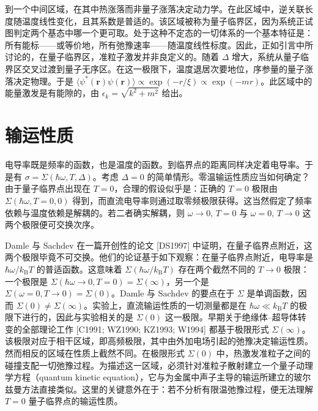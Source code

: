 到一个中间区域，在其中热涨落而非量子涨落决定动力学。在此区域中，逆关联长度随温度线性变化，且其系数是普适的。该区域被称为量子临界区，因为系统正试图判定两个基态中哪一个更可取。处于这种不定态的一切体系的一个基本特征是：所有能标——或等价地，所有弛豫速率——随温度线性标度。因此，正如引言中所讨论的，在量子临界区，准粒子激发并非良定义的。随着 $\Delta$ 增大，系统从量子临界区交叉过渡到量子无序区。在这一极限下，温度退居次要地位，序参量的量子涨落决定物理。于是 $\langle\psi^{*}(\mathbf{r})\psi(\mathbf{r})\rangle\propto\exp(-r/\xi)\propto\exp(-mr)$。此区域中的能量激发是有能隙的，由 $\epsilon_{k}=\sqrt{k^{2}+m^{2}}$ 给出。

\section{输运性质}

电导率既是频率的函数，也是温度的函数。到临界点的距离同样决定着电导率。于是有 $\sigma=\Sigma(\hbar\omega,T,\Delta)$。考虑 $\Delta=0$ 的简单情形。零温输运性质应当如何确定？由于量子临界点出现在 $T=0$，合理的假设似乎是：正确的 $T=0$ 极限由 $\Sigma(\hbar\omega,T=0,0)$ 得到，而直流电导率则通过取零频极限获得。这当然假定了频率依赖与温度依赖是解耦的。若二者确实解耦，则 $\omega\to0,\,T=0$ 与 $\omega=0,\,T\to0$ 这两个极限便可交换次序。

Damle 与 Sachdev 在一篇开创性的论文 [DS1997] 中证明，在量子临界点附近，这两个极限毕竟不可交换。他们的论证基于如下观察：在量子临界点附近，电导率是 $\hbar\omega/k_{\mathrm{B}}T$ 的普适函数。这意味着 $\Sigma(\hbar\omega/k_{\mathrm{B}}T)$ 存在两个截然不同的 $T\to0$ 极限：一个极限是 $\Sigma(\hbar\omega\to0,T=0)=\Sigma(\infty)$，另一个是 $\Sigma(\omega=0,T\to0)=\Sigma(0)$。Damle 与 Sachdev 的要点在于 $\Sigma$ 是单调函数，因而 $\Sigma(0)\neq\Sigma(\infty)$。实验上，直流输运性质的一切测量都是在 $\hbar\omega\ll k_{\mathrm{B}}T$ 的极限下进行的，因此与实验相关的是 $\Sigma(0)$ 这一极限。早期关于绝缘体–超导体转变的全部理论工作 [C1991; WZ1990; KZ1993; W1994] 都基于极限形式 $\Sigma(\infty)$。该极限对应于相干区域，即高频极限，其中由外加电场引起的弛豫决定输运性质。然而相反的区域在性质上截然不同。在极限形式 $\Sigma(0)$ 中，热激发准粒子之间的碰撞支配一切弛豫过程。为描述这一区域，必须针对准粒子散射建立一个量子动理学方程（quantum kinetic equation），它与为金属中声子主导的输运所建立的玻尔兹曼方法直接类似。这里的关键意外在于：若不分析有限温弛豫过程，便无法理解 $T=0$ 量子临界点的输运性质。

